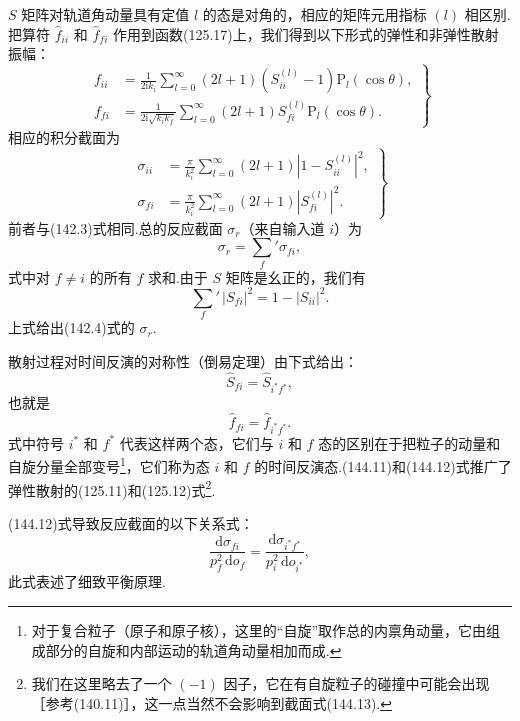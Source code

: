 $S$ 矩阵对轨道角动量具有定值 $l$ 的态是对角的，相应的矩阵元用指标 $(l)$ 相区别.把算符 $\hat{f}_{ii}$ 和 $\hat{f}_{fi}$ 作用到函数(125.17)上，我们得到以下形式的弹性和非弹性散射振幅：
\begin{equation}
\left.\begin{aligned}
  f_{ii}&=\frac{1}{2\mathrm{i}k_i}\sum_{l=0}^{\infty}(2l+1)
  \left(S_{ii}^{(l)}-1\right)\mathrm{P}_l(\cos\theta),\\
  f_{fi}&=\frac{1}{2\mathrm{i}\sqrt{k_ik_f}}\sum_{l=0}^{\infty}(2l+1)
  S_{fi}^{(l)}\mathrm{P}_l(\cos\theta).
\end{aligned}\right\}
\end{equation}
相应的积分截面为
\begin{equation}
\left.\begin{aligned}
  \sigma_{ii}&=\frac{\pi}{k_i^2}\sum_{l=0}^{\infty}(2l+1)
  \left|1-S_{ii}^{(l)}\right|^2,\\
  \sigma_{fi}&=\frac{\pi}{k_i^2}\sum_{l=0}^{\infty}(2l+1)
  \left|S_{fi}^{(l)}\right|^2.
\end{aligned}\right\}
\end{equation}
前者与(142.3)式相同.总的反应截面 $\sigma_r$（来自输入道 $i$）为
\begin{equation*}
  \sigma_r=\sum_f{}'\sigma_{fi},
\end{equation*}
式中对 $f\neq i$ 的所有 $f$ 求和.由于 $S$ 矩阵是幺正的，我们有
\begin{equation*}
  \sum_f{}'\,|S_{fi}|^2=1-|S_{ii}|^2.
\end{equation*}
上式给出(142.4)式的 $\sigma_r$.

散射过程对时间反演的对称性（倒易定理）由下式给出：
\begin{equation}
  \hat{S}_{fi}=\hat{S}_{i^{*}f^{*}},
\end{equation}
也就是
\begin{equation}
  \hat{f}_{fi}=\hat{f}_{i^{*}f^{*}}.
\end{equation}
式中符号 $i^{*}$ 和 $f^{*}$ 代表这样两个态，它们与 $i$ 和 $f$ 态的区别在于把粒子的动量和自旋分量全部变号\footnote{对于复合粒子（原子和原子核），这里的“自旋”取作总的内禀角动量，它由组成部分的自旋和内部运动的轨道角动量相加而成.}，它们称为态 $i$ 和 $f$ 的时间反演态.(144.11)和(144.12)式推广了弹性散射的(125.11)和(125.12)式\footnote{我们在这里略去了一个 $(-1)$ 因子，它在有自旋粒子的碰撞中可能会出现［参考(140.11)］，这一点当然不会影响到截面式(144.13).}.

(144.12)式导致反应截面的以下关系式：
\begin{equation}
  \frac{\mathrm{d}\sigma_{fi}}{p_f^2\,\mathrm{d}o_f}
  =\frac{\mathrm{d}\sigma_{i^{*}f^{*}}}{p_i^2\,\mathrm{d}o_{i^{*}}},
\end{equation}
此式表述了细致平衡原理.

